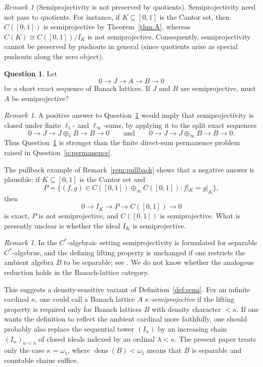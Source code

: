 \documentclass[11pt]{amsart}
\numberwithin{equation}{section}
\theoremstyle{definition}
\newtheorem{question}[theorem]{Question}
\theoremstyle{remark}
\newtheorem{remark}[theorem]{Remark}
\theoremstyle{plain}
\begin{document}
\begin{remark}[Semiprojectivity is not preserved by quotients]\label{rem:quotients}
Semiprojectivity need not pass to quotients.
For instance, if $K\subseteq[0,1]$ is the Cantor set, then $C([0,1])$ is semiprojective
by Theorem~\ref{thm:A}, whereas $C(K)\cong C([0,1])/I_K$ is not semiprojective.
Consequently, semiprojectivity cannot be preserved by pushouts in general
(since quotients arise as special pushouts along the zero object).
\end{remark}

\begin{question}\label{q:extensions}
Let
\[
0\to J\to A\to B\to 0
\]
be a short exact sequence of Banach lattices.
If \(J\) and \(B\) are semiprojective, must \(A\) be semiprojective?
\end{question}

\begin{remark}
A positive answer to Question~\ref{q:extensions} would imply that semiprojectivity
is closed under finite \(\ell_1\)- and \(\ell_\infty\)-sums, by applying it to the split
exact sequences
\[
0\to J\to J\oplus_1 B\to B\to 0
\qquad\text{and}\qquad
0\to J\to J\oplus_\infty B\to B\to 0.
\]
Thus Question~\ref{q:extensions} is stronger than the finite direct-sum permanence
problem raised in Question~\ref{q:permanence}.

The pullback example of Remark~\ref{rem:pullback} shows that a negative answer is
plausible: if \(K\subseteq[0,1]\) is the Cantor set and
\[
P=\{(f,g)\in C([0,1])\oplus_\infty C([0,1]) : f|_K=g|_K\},
\]
then
\[
0\to I_K\to P\to C([0,1])\to 0
\]
is exact, \(P\) is not semiprojective, and \(C([0,1])\) is semiprojective.
What is presently unclear is whether the ideal \(I_K\) is semiprojective.
\end{remark}

\begin{remark}
In the $C^*$-algebraic setting semiprojectivity is formulated for separable
$C^*$-algebras, and the defining lifting property is unchanged if one restricts
the ambient algebra $B$ to be separable; see \cite[pp.~11--12]{blackadar-survey}.
We do not know whether the analogous reduction holds in the Banach-lattice category.

This suggests a density-sensitive variant of Definition~\ref{def:semi}.
For an infinite cardinal $\kappa$, one could call a Banach lattice $A$
\emph{$\kappa$-semiprojective} if the lifting property is required only for
Banach lattices $B$ with density character $<\kappa$.
If one wants the definition to reflect the ambient cardinal more faithfully,
one should probably also replace the sequential tower $(I_n)$ by an increasing
chain $(I_\alpha)_{\alpha<\lambda}$ of closed ideals indexed by an ordinal
$\lambda<\kappa$.
The present paper treats only the case $\kappa=\omega_1$, where
$\operatorname{dens}(B)<\omega_1$ means that $B$ is separable and countable
chains suffice.
\end{remark}
\end{document}
